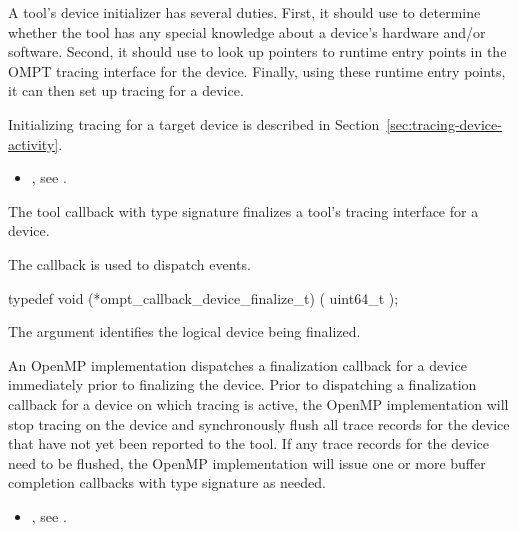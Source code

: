 \effect

A tool's device initializer has several duties.  First, it should use
 to determine whether the tool has any special knowledge
about a device's hardware and/or software.  Second, it should use
 to look up pointers to runtime entry points in the OMPT tracing
interface for the device.  Finally, using these runtime entry points, it can
then set up tracing for a device.

Initializing tracing for a target device is described in 
Section~\ref{sec:tracing-device-activity}.

\crossreferences
\begin{itemize}
\item {}, see
  .
\end{itemize}


\label{sec:ompt_callback_device_finalize_t}

\summary The tool callback with type signature
 finalizes a
tool's tracing interface for a device.

The  callback is used to dispatch
 events.

\format

\begin{ccppspecific}
\begin{omptCallback}
typedef void (*ompt_callback_device_finalize_t) (
  uint64_t 
);
\end{omptCallback}
\end{ccppspecific}


\argdesc

The argument  identifies the logical device
being finalized.

\descr

An OpenMP implementation dispatches a finalization callback for a
device immediately prior to finalizing the device. Prior to dispatching
a finalization callback for a device on which tracing is active,
the OpenMP implementation will stop tracing on the device and
synchronously flush all trace records for the device 
that have not yet been reported to the tool. 
If any trace records for the device need to be flushed,
the OpenMP implementation will issue one or more
buffer completion callbacks with type signature 
as needed.

\crossreferences
\begin{itemize}
\item {}, see
  .
\end{itemize}
